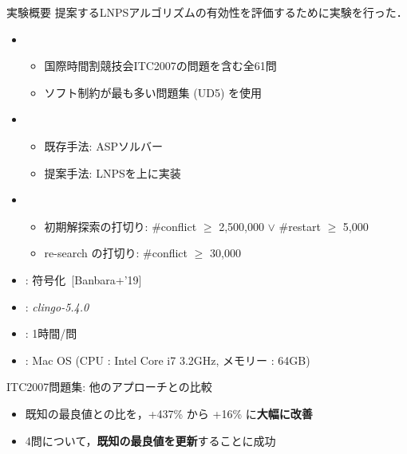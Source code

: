 \documentclass[11pt,dvipdfmx]{beamer}
\begin{document}
\begin{frame}{実験概要}
  提案するLNPSアルゴリズムの有効性を評価するために実験を行った．
  \bigskip
  \begin{itemize}
  \item {}
    \begin{itemize}
    \item 国際時間割競技会ITC2007の問題を含む全61問
    \item ソフト制約が最も多い問題集 (UD5) を使用
    \end{itemize}
  \item {}
    \begin{itemize}
    \item 既存手法: ASPソルバー{\clingo}
    \item 提案手法: LNPSを{\clingo}上に実装
    \end{itemize}
   \item {}
    \begin{itemize}
    \item 初期解探索の打切り:
      \#conflict $\geq$ 2,500,000 $\lor$ \#restart $\geq$ 5,000
     \item re-search の打切り: \#conflict $\geq$ 30,000
    \end{itemize}
  \item {}: {\teaspoon} 符号化~[Banbara+'19]
  \item {}: \textit{clingo-5.4.0}
  \item {}: 1時間/問
  \item {}: Mac OS (CPU : Intel Core i7 3.2GHz, メモリー : 64GB) 
  \end{itemize}
\end{frame}
\begin{frame}{ITC2007問題集: 他のアプローチとの比較}
  \begin{center}
  \begin{tableB}
    
  \end{tableB}
  \end{center}
  \begin{itemize}
      \item 既知の最良値との比を，+437\% から +16\% に\alert{\bf 大幅に改善}
      \item 4問について，\alert{\bf 既知の最良値を更新}することに成功
  \end{itemize}
\end{frame}
\end{document}
